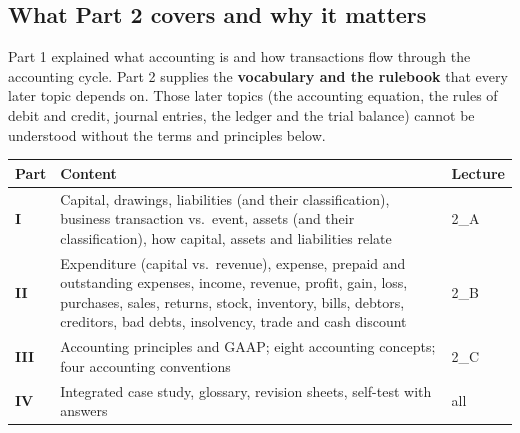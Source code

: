 \documentclass[11pt,a4paper]{article}
\renewcommand{\arraystretch}{1.3}
\begin{document}
\subsection*{What Part 2 covers and why it matters}
Part 1 explained what accounting is and how transactions flow through the accounting cycle. Part 2
supplies the \textbf{vocabulary and the rulebook} that every later topic depends on. Those later
topics (the accounting equation, the rules of debit and credit, journal entries, the ledger and
the trial balance) cannot be understood without the terms and principles below.

\begin{center}
\footnotesize\renewcommand{\arraystretch}{1.08}
\begin{tabularx}{\textwidth}{@{}l Y l@{}}
\toprule
{}\textbf{Part} & \textbf{Content} & \textbf{Lecture}\\
\midrule
\textbf{I} & Capital, drawings, liabilities (and their classification), business transaction vs.\ event, assets (and their classification), how capital, assets and liabilities relate & 2\_A\\
\textbf{II} & Expenditure (capital vs.\ revenue), expense, prepaid and outstanding expenses, income, revenue, profit, gain, loss, purchases, sales, returns, stock, inventory, bills, debtors, creditors, bad debts, insolvency, trade and cash discount & 2\_B\\
\textbf{III} & Accounting principles and GAAP; eight accounting concepts; four accounting conventions & 2\_C\\
\textbf{IV} & Integrated case study, glossary, revision sheets, self-test with answers & all\\
\bottomrule
\end{tabularx}
\end{center}
\end{document}
